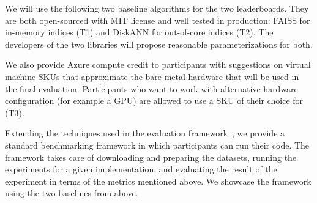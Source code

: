 We will use the following two baseline algorithms for the two
leaderboards.  They are both open-sourced with MIT license and well
tested in production: FAISS for in-memory indices (T1) and DiskANN for out-of-core indices (T2). 
The developers of the two libraries will propose reasonable parameterizations for both.
\iffalse 
\begin{itemize}
  \item FAISS for in-memory indices (T1). 
    \url{https://github.com/facebookresearch/faiss}
  \item DiskANN for out-of-core indices (T2).
    \url{https://github.com/microsoft/DiskANN}
\end{itemize}
\fi

\iffalse 
In addition to the data and corresponding ground-truth listed earlier,
we will provide a 1\% and 10\% sample of the dataset (10M and
100M points respectively) for participants to develop, debug and
optimize their code with shorter turn-around times.
\fi

We also provide Azure compute credit to participants with
suggestions on virtual machine SKUs that approximate the bare-metal
hardware that will be used in the final evaluation.  Participants who
want to work with alternative hardware configuration (for example a
GPU) are allowed to use a SKU of their choice for (T3).


Extending the techniques used in the evaluation framework~\cite{Benchmark}, 
we provide a standard benchmarking framework in which participants can 
run their code.
The framework takes care of downloading and preparing the datasets,
running the experiments for a given implementation, 
and evaluating the result of the experiment in terms of the metrics mentioned above.
We showcase the framework using the two baselines from above.



